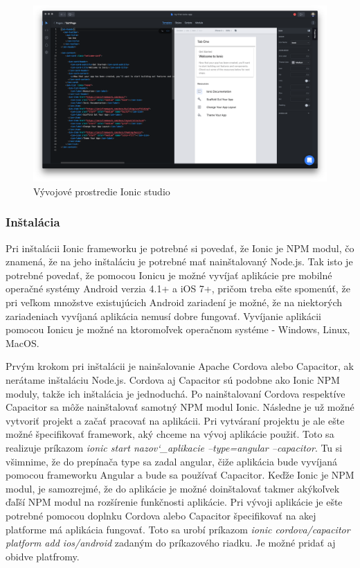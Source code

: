 \begin{figure}[H]
    \centering
    \includegraphics[scale=0.12]{img/ionic_studio.png}
    \caption{Vývojové prostredie Ionic studio}
    \label{fig:ionic_studio}
\end{figure}

\subsubsection{Inštalácia}
\indent Pri inštalácii Ionic frameworku je potrebné si povedať, že Ionic je NPM modul, čo znamená, že na jeho inštaláciu je potrebné mať nainštalovaný Node.js. Tak isto je potrebné povedať, že pomocou Ionicu je možné vyvíjať aplikácie pre mobilné operačné systémy Android verzia 4.1+ a iOS 7+, pričom treba ešte spomenúť, že pri veľkom množstve existujúcich Android zariadení je možné, že na niektorých zariadeniach vyvíjaná aplikácia nemusí dobre fungovať. Vyvíjanie aplikácii pomocou Ionicu je možné na ktoromoľvek operačnom systéme - Windows, Linux, MacOS. 

\indent Prvým krokom pri inštalácii je nainšalovanie Apache Cordova alebo Capacitor, ak nerátame inštaláciu Node.js. Cordova aj Capacitor sú podobne ako Ionic NPM moduly, takže ich inštalácia je jednoduchá. Po nainštalovaní Cordova respektíve Capacitor sa môže nainštalovať samotný NPM modul Ionic. Následne je už možné vytvoriť projekt a začať pracovať na aplikácii. Pri vytváraní projektu je ale ešte možné špecifikovať framework, aký chceme na vývoj aplikácie použiť. Toto sa realizuje príkazom \textit{ionic start nazov\char`_aplikacie --type=angular --capacitor}. Tu si všimnime, že do prepínača type sa zadal angular, čiže aplikácia bude vyvíjaná pomocou frameworku Angular a bude sa používať Capacitor. Keďže Ionic je NPM modul, je samozrejmé, že do aplikácie je možné doinštalovať takmer akýkoľvek ďaľší NPM modul na rozšírenie funkčnosti aplikácie. Pri vývoji aplikácie je ešte potrebné pomocou doplnku Cordova alebo Capacitor špecifikovať na akej platforme má aplikácia fungovať. Toto sa urobí príkazom \textit{ionic cordova/capacitor platform add ios/android} zadaným do príkazového riadku. Je možné pridať aj obidve platfromy. 

